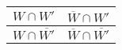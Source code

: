 \documentclass{article}                     %
\makeatletter
\theoremstyle{definition}
\newcommand{\raisemath}[1]{\mathpalette{\raisem@th{#1}}}
\newcommand{\raisem@th}[3]{\raisebox{#1}{$#2#3$}}
\newcommand{\nmc}{%
	\mathbin{\mathpalette\nm@\expandafter}
}
\newcommand{\nm@}{\mid\joinrel\mkern-.5mu\sim\mkern-3mu}
\newcommand{\bigperpp}{%
	\mathop{\mathpalette\bigp@rpp\relax}%
	\displaylimits
}
\newcommand{\bigp@rpp}[2]{%
	\vcenter{
		\m@th\hbox{\scalebox{\ifx#1\displaystyle1.15\else1.15\fi}{$#1\perp$}}
	}%
}
\newcommand{\bigperp}{\raisemath{.5pt}{\bigperpp}}
\makeatother
\begin{document}
\begin{center}
\renewcommand{\arraystretch}{4}
\begin{tabular}{|c|c|}
\hline 
 $ W \cap W' $ & $ \overline{W}\cap W' $  \\ 
\hline 
$ W\cap\overline{W'} $ & $\overline{W}\cap\overline{W'} $  \\ 
\hline 
\end{tabular} 
\end{center}







% 
\end{document}
